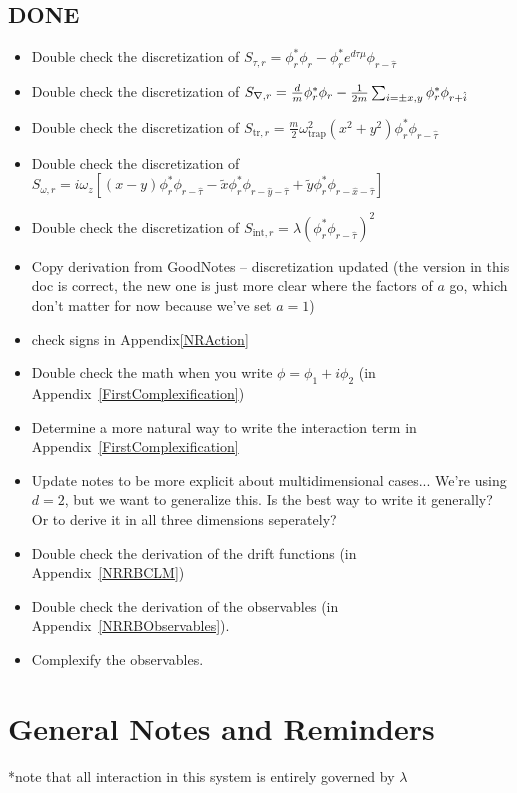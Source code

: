 \documentclass[../RotatingBosons.tex]{subfiles}
\begin{document}
\subsection{DONE}
\begin{itemize}
	\item Double check the discretization of $S_{\tau, r}  =  \phi^{*}_{r}\phi_{r}- \phi^{*}_{r}e^{d \tau \mu} \phi_{r - \hat{\tau}} $
	\item Double check the discretization of $S_{{\nabla}, r}  =  \frac{d}{m} \phi^{*}_{r}\phi_{r} - \frac{1}{2m}\sum_{i = \pm x,y} \phi^{*}_{r}\phi_{r+\hat{i}}$
	\item Double check the discretization of $S_{\mathrm{tr},r} = \frac{m}{2}\omega_{\text{trap}}^{2}(x^{2}+y^{2})\phi_{r}^{*}\phi_{r-\hat{\tau}}$
	\item Double check the discretization of $S_{\omega, r} =  i \omega_{z} \left[ (x-y)\phi_{r}^{*}  \phi_{r-\hat{\tau}} - \widetilde{x} \phi_{r}^{*} \phi_{r-\hat{y}-\hat{\tau}} + \widetilde{y} \phi_{r}^{*}  \phi_{r-\hat{x}-\hat{\tau}} \right] $
	\item Double check the discretization of $S_{\text{int}, r} = \lambda \left(\phi_{r}^{*} \phi_{r-\hat{\tau}}\right)^{2}$	
	\item Copy derivation from GoodNotes -- discretization updated (the version in this doc is correct, the new one is just more clear where the factors of $a$ go, which don't matter for now because we've set $a = 1$)
	\item check signs in Appendix\ref{NRAction}
	\item Double check the math when you write $\phi = \phi_{1} + i\phi_{2}$ (in Appendix~\ref{FirstComplexification})
	\item Determine a more natural way to write the interaction term in Appendix~\ref{FirstComplexification}
	\item Update notes to be more explicit about multidimensional cases... We're using $d=2$, but we want to generalize this. Is the best way to write it generally? Or to derive it in all three dimensions seperately?
	\item Double check the derivation of the drift functions (in Appendix~\ref{NRRBCLM}) 
	\item Double check the derivation of the observables (in Appendix~\ref{NRRBObservables}).
	\item Complexify the observables. 
\end{itemize}

\section{General Notes and Reminders}
*note that all interaction in this system is entirely governed by $\lambda$
\end{document}
